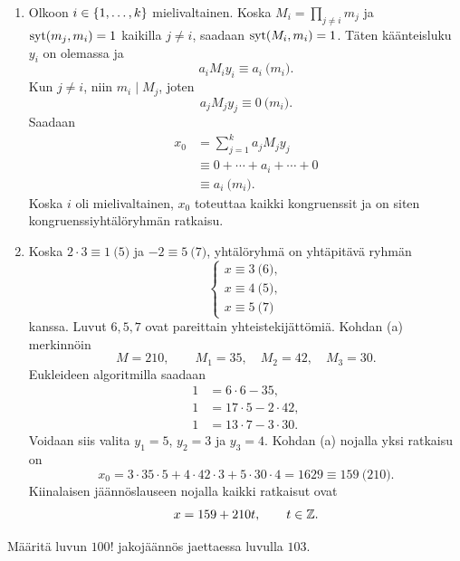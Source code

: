 \documentclass[11pt,a4paper]{amsart}
\begin{document}
\begin{solution}
  \leavevmode\par
  \begin{enumerate}[label=(\alph*), nosep]
    \item Olkoon \(i \in \left\lbrace1,\dots,k\right\rbrace\) mielivaltainen. Koska
      \(M_i=\prod_{j\ne i}m_j\) ja \(\operatorname{syt}(m_j,m_i)=1\) kaikilla
      \(j\ne i\), saadaan \(\operatorname{syt}(M_i,m_i)=1\). Täten käänteisluku
      \(y_i\) on olemassa ja
      \[
        a_iM_iy_i \equiv a_i \pod{m_i}.
      \]
      Kun \(j \neq i\), niin \(m_i \mid M_j\), joten
      \[
        a_jM_jy_j \equiv 0 \pod{m_i}.
      \]
      Saadaan
      \[
        \begin{aligned}
          x_0 &= \sum_{j=1}^{k} a_jM_jy_j \\
          &\equiv 0 + \cdots + a_i + \cdots + 0 \\
          &\equiv a_i \pod{m_i}.
        \end{aligned}
      \]
      Koska \(i\) oli mielivaltainen, \(x_0\) toteuttaa kaikki
      kongruenssit ja on siten kongruenssiyhtälöryhmän ratkaisu.
    \item Koska \(2\cdot 3\equiv 1\pod{5}\) ja
      \(-2\equiv 5\pod{7}\), yhtälöryhmä on yhtäpitävä ryhmän
      \[
        \begin{cases}
          x\equiv 3\pod{6},\\
          x\equiv 4\pod{5},\\
          x\equiv 5\pod{7}
        \end{cases}
      \]
      kanssa. Luvut \(6,5,7\) ovat pareittain yhteistekijättömiä.
      Kohdan (a) merkinnöin
      \[
        M=210,\qquad M_1=35,\quad M_2=42,\quad M_3=30.
      \]
      Eukleideen algoritmilla saadaan
      \[
        \begin{aligned}
          1&=6\cdot 6-35,\\
          1&=17\cdot 5-2\cdot 42,\\
          1&=13\cdot 7-3\cdot 30.
        \end{aligned}
      \]
      Voidaan siis valita \(y_1=5\), \(y_2=3\) ja \(y_3=4\).
      Kohdan (a) nojalla yksi ratkaisu on
      \[
        x_0=3\cdot 35\cdot 5+4\cdot 42\cdot 3+5\cdot 30\cdot 4
        =1629\equiv 159\pod{210}.
      \]
      Kiinalaisen jäännöslauseen nojalla kaikki ratkaisut ovat
      \[
        x=159+210t,\qquad t\in\mathbb{Z}.
      \]
  \end{enumerate}
\end{solution}

\begin{exercise}
  Määritä luvun \(100!\) jakojäännös jaettaessa luvulla \(103\).
\end{exercise}
\end{document}

